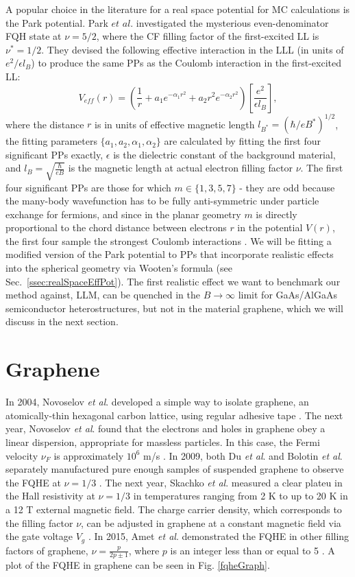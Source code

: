    A popular choice in the literature for a real space potential for MC calculations is the Park potential. Park $\textit{et al.}$ investigated the mysterious even-denominator FQH state at $\nu=5/2$, where the CF filling factor of the first-excited LL is $\nu^*=1/2$. They devised the following effective interaction in the LLL (in units of $e^2/\epsilon l_B$) to produce the same PPs as the Coulomb interaction in the first-excited LL:
    \begin{equation} \label{parkPot}
    V_{eff}(r)=\left(\frac{1}{r}+a_1e^{-\alpha_1r^2}+a_2r^2e^{-\alpha_2r^2}\right)\left[\frac{e^2}{\epsilon l_B}\right],
    \end{equation}
    where the distance $r$ is in units of effective magnetic length $l_{B^*}=(\hbar/eB^*)^{1/2}$, the fitting parameters $\{a_1,a_2,\alpha_1,\alpha_2\}$ are calculated by fitting the first four significant PPs exactly, $\epsilon$ is the dielectric constant of the background material, and $l_B=\sqrt{\frac{\hbar}{eB}}$ is the magnetic length at actual electron filling factor $\nu$. The first four significant PPs are those for which $m\in\{1,3,5,7\}$ - they are odd because the many-body wavefunction has to be fully anti-symmetric under particle exchange for fermions, and since in the planar geometry $m$ is directly proportional to the chord distance between electrons $r$ in the potential $V(r)$, the first four sample the strongest Coulomb interactions \cite{park}. We will be fitting a modified version of the Park potential to PPs that incorporate realistic effects into the spherical geometry via Wooten's formula (see Sec.~\ref{ssec:realSpaceEffPot}). The first realistic effect we want to benchmark our method against, LLM, can be quenched in the $B\rightarrow\infty$ limit for GaAs/AlGaAs semiconductor heterostructures, but not in the material graphene, which we will discuss in the next section.

    \section{Graphene}\label{sec:graph}
    In 2004, Novoselov \textit{et al}. developed a simple way to isolate graphene, an atomically-thin hexagonal carbon lattice, using regular adhesive tape \cite{novoselov}. The next year, Novoselov \textit{et al}. found that the electrons and holes in graphene obey a linear dispersion, appropriate for massless particles. In this case, the Fermi velocity $\nu_F$ is approximately $10^6$ m/s \cite{novoselov2005}. In 2009, both Du \textit{et al}. and Bolotin \textit{et al}. separately manufactured pure enough samples of suspended graphene to observe the FQHE at $\nu=1/3$ \cite{du,bolotin}. The next year, Skachko \textit{et al}. measured a clear plateu in the Hall resistivity at $\nu=1/3$ in temperatures ranging from 2 K to up to 20 K in a 12 T external magnetic field. The charge carrier density, which corresponds to the filling factor $\nu$, can be adjusted in graphene at a constant magnetic field via the gate voltage $V_g$ \cite{skachko}. In 2015, Amet \textit{et al}. demonstrated the FQHE in other filling factors of graphene, $\nu=\frac{p}{2p\pm1}$, where $p$ is an integer less than or equal to 5 \cite{amet}. A plot of the FQHE in graphene can be seen in Fig. \ref{fqheGraph}.
	
